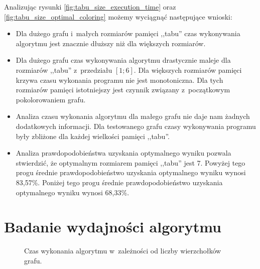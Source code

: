 \documentclass[a4paper,10pt]{article}
\begin{document}
Analizując rysunki \ref{fig:tabu_size_execution_time} oraz \ref{fig:tabu_size_optimal_coloring} możemy wyciągnąć następujące wnioski:

\begin{itemize}
    \item Dla dużego grafu i~małych rozmiarów pamięci ,,tabu'' czas wykonywania algorytmu jest znacznie dłuższy niż dla większych rozmiarów.
    \item Dla dużego grafu czas wykonywania algorytmu drastycznie maleje dla rozmiarów ,,tabu'' z~przedziału $[1; 6]$. Dla większych rozmiarów pamięci krzywa czasu wykonania programu nie jest monotoniczna. Dla tych rozmiarów pamięci istotniejszy jest czynnik związany z~początkowym pokolorowaniem grafu.
    \item Analiza czasu wykonania algorytmu dla małego grafu nie daje nam żadnych dodatkowych informacji. Dla testowanego grafu czasy wykonywania programu były zbliżone dla każdej wielkości pamięci ,,tabu''.
    \item Analiza prawdopodobieństwa uzyskania optymalnego wyniku pozwala stwierdzić, że optymalnym rozmiarem pamięci ,,tabu'' jest 7. Powyżej tego progu średnie prawdopodobieństwo uzyskania optymalnego wyniku wynosi 83,57\%. Poniżej tego progu średnie prawdopodobieństwo uzyskania optymalnego wyniku wynosi 68,33\%.
\end{itemize}

\section*{Badanie wydajności algorytmu}

\begin{figure}[ht!]
    \centering
    \caption{Czas wykonania algorytmu w~zależności od liczby wierzchołków grafu.}
    \label{fig:algorithm_efficiency}
\end{figure}
\end{document}
